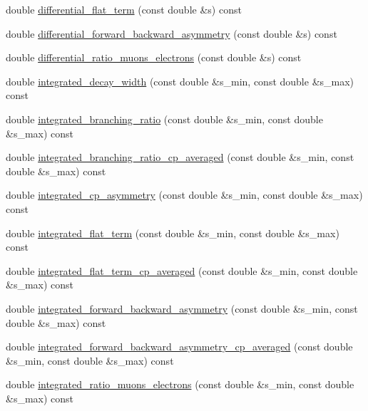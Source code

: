 \begin{DoxyCompactItemize}
\item 
double \hyperlink{classeos_1_1BToKDilepton_3_01LargeRecoil_01_4_aef67f10140972af5fe38c690f0f1db26}{differential\_\-flat\_\-term} (const double \&s) const 
\item 
double \hyperlink{classeos_1_1BToKDilepton_3_01LargeRecoil_01_4_a0573edf87ee0c003a84620a1f3acccfc}{differential\_\-forward\_\-backward\_\-asymmetry} (const double \&s) const 
\item 
double \hyperlink{classeos_1_1BToKDilepton_3_01LargeRecoil_01_4_a486e55270938cb3588e20ae0225f769c}{differential\_\-ratio\_\-muons\_\-electrons} (const double \&s) const 
\item 
double \hyperlink{classeos_1_1BToKDilepton_3_01LargeRecoil_01_4_a55025133609d14e639cc4e8f1204151c}{integrated\_\-decay\_\-width} (const double \&s\_\-min, const double \&s\_\-max) const 
\item 
double \hyperlink{classeos_1_1BToKDilepton_3_01LargeRecoil_01_4_ab42894d5d92d65801033f341be792882}{integrated\_\-branching\_\-ratio} (const double \&s\_\-min, const double \&s\_\-max) const 
\item 
double \hyperlink{classeos_1_1BToKDilepton_3_01LargeRecoil_01_4_a6053c38968017aaaeadfd4ef86bfa0b5}{integrated\_\-branching\_\-ratio\_\-cp\_\-averaged} (const double \&s\_\-min, const double \&s\_\-max) const 
\item 
double \hyperlink{classeos_1_1BToKDilepton_3_01LargeRecoil_01_4_ae55c560395de7f7ab6d25571849b5c0e}{integrated\_\-cp\_\-asymmetry} (const double \&s\_\-min, const double \&s\_\-max) const 
\item 
double \hyperlink{classeos_1_1BToKDilepton_3_01LargeRecoil_01_4_a36fef9f26bcd337a7a96a1a6c70fffbd}{integrated\_\-flat\_\-term} (const double \&s\_\-min, const double \&s\_\-max) const 
\item 
double \hyperlink{classeos_1_1BToKDilepton_3_01LargeRecoil_01_4_a2ca98c4fb9f6f0ed792d38ffdd6fea30}{integrated\_\-flat\_\-term\_\-cp\_\-averaged} (const double \&s\_\-min, const double \&s\_\-max) const 
\item 
double \hyperlink{classeos_1_1BToKDilepton_3_01LargeRecoil_01_4_aa2550f12d2247e5238cae36ca16bfeab}{integrated\_\-forward\_\-backward\_\-asymmetry} (const double \&s\_\-min, const double \&s\_\-max) const 
\item 
double \hyperlink{classeos_1_1BToKDilepton_3_01LargeRecoil_01_4_a0c327b43113802ce26301ebe6948a718}{integrated\_\-forward\_\-backward\_\-asymmetry\_\-cp\_\-averaged} (const double \&s\_\-min, const double \&s\_\-max) const 
\item 
double \hyperlink{classeos_1_1BToKDilepton_3_01LargeRecoil_01_4_a8d86b023702dff71ea43ff12acc159a8}{integrated\_\-ratio\_\-muons\_\-electrons} (const double \&s\_\-min, const double \&s\_\-max) const 
\end{DoxyCompactItemize}

